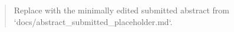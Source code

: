 \begin{abstract}
Replace with the minimally edited submitted abstract from `docs/abstract_submitted_placeholder.md`.
\end{abstract}
